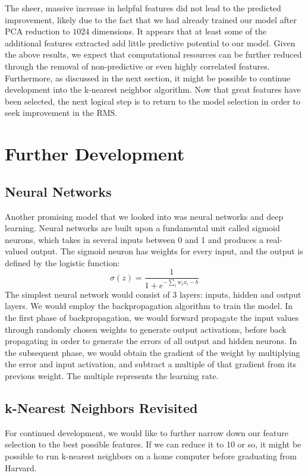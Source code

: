 \documentclass[letterpaper]{article}
\begin{document}
\noindent The sheer, massive increase in helpful features did not lead to the predicted improvement, likely due to the fact that we had already trained our model after  PCA reduction to $1024$ dimensions. It appears that at least some of the additional features extracted add little predictive potential to our model. Given the above results, we expect that computational resources can be further reduced through the removal of non-predictive or even highly correlated features. Furthermore, as discussed in the next section, it might be possible to continue development into the k-nearest neighbor algorithm. Now that great features have been selected, the next logical step is to return to the model selection in order to seek improvement in the RMS. 


\section{Further Development}
\subsection{Neural Networks}
Another promising model that we looked into was neural networks and deep learning. Neural networks are built upon a fundamental unit called sigmoid neurons, which takes in several inputs between 0 and 1 and produces a real-valued output. The sigmoid neuron has weights for every input, and the output is defined by the logistic function:
$$\sigma (z) = \frac{1}{1 + e^{-\sum_{i} w_i x_i - b}}$$
The simplest neural network would consist of 3 layers: inputs, hidden and output layers. We would employ the backpropagation algorithm to train the model. In the first phase of backpropagation, we would forward propagate the input values through randomly chosen weights to generate output activations, before back propagating in order to generate the errors of all output and hidden neurons. In the subsequent phase, we would obtain the gradient of the weight by multiplying the error and input activation, and subtract a multiple of that gradient from its previous weight. The multiple represents the learning rate.

\subsection{k-Nearest Neighbors Revisited}
For continued development, we would like to further narrow down our feature selection to the best possible features. If we can reduce it to 10 or so, it might be possible to run k-nearest neighbors on a home computer before graduating from Harvard.
\end{document}
